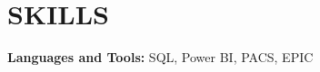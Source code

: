 
\section{\textcolor{airforceblue}{SKILLS}}
 \begin{itemize}[leftmargin=0in, label={}]
    \small{\item{
     \textbf{Languages and Tools:}{ SQL, Power BI, PACS, EPIC} \\
      \vspace{1.2pt}
     }}
 \end{itemize}
 \vspace{-10pt}
